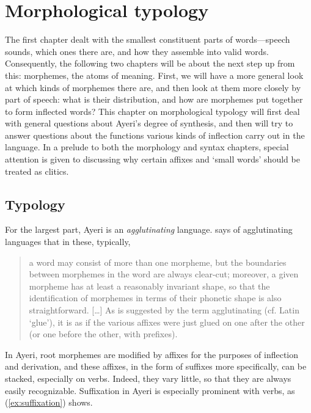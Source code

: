 \chapter{Morphological typology}
\label{ch:morphtyp}

The first chapter dealt with the smallest constituent parts of words---speech
sounds, which ones there are, and how they assemble into valid words.
Consequently, the following two chapters will be about the next step up from
this: morphemes, the atoms of meaning. First, we will have a more general look
at which kinds of morphemes there are, and then look at them more closely by
part of speech: what is their distribution, and how are morphemes put together
to form inflected words? This chapter on morphological typology will first deal
with general questions about Ayeri's degree of synthesis, and then will try to
answer questions about the functions various kinds of inflection carry out in
the language. In a prelude to both the morphology and syntax chapters, special
attention is given to discussing why certain affixes and `small words' should
be treated as clitics.

\section{Typology}
\label{sec:typology}

For the largest part, Ayeri is an \emph{agglutinating} 
language. \citet{comrie1989} says of agglutinating languages that in these, 
typically,

\blockcquote[43--44]{comrie1989}{a word may consist of more than one morpheme,
but the boundaries between morphemes in the word are always clear-cut;
moreover, a given morpheme has at least a reasonably invariant shape, so that
the identification of morphemes in terms of their phonetic shape is also
straightforward. [\dots] As is suggested by the term agglutinating (cf. Latin
 `glue'), it is as if the various affixes were just glued on one 
after the other (or one before the other, with prefixes).}

In Ayeri, root morphemes are modified by affixes for the purposes of inflection
and derivation, and these affixes, in the form of suffixes more
specifically, can be stacked, especially on verbs. Indeed, they vary little, so
that they are always easily recognizable. Suffixation in Ayeri is especially
prominent with verbs, as (\ref{ex:suffixation}) shows.

